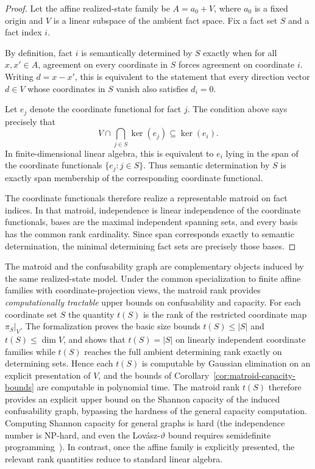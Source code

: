 \begin{proof}
Let the affine realized-state family be $A=a_0+V$, where $a_0$ is a fixed origin and $V$ is a linear subspace of the ambient fact space. Fix a fact set $S$ and a fact index $i$.

By definition, fact $i$ is semantically determined by $S$ exactly when for all $x,x'\in A$, agreement on every coordinate in $S$ forces agreement on coordinate $i$. Writing $d=x-x'$, this is equivalent to the statement that every direction vector $d\in V$ whose coordinates in $S$ vanish also satisfies $d_i=0$.

Let $e_j$ denote the coordinate functional for fact $j$. The condition above says precisely that
\[
V\cap \bigcap_{j\in S}\ker(e_j)\subseteq \ker(e_i).
\]
In finite-dimensional linear algebra, this is equivalent to $e_i$ lying in the span of the coordinate functionals $\{e_j:j\in S\}$. Thus semantic determination by $S$ is exactly span membership of the corresponding coordinate functional.

The coordinate functionals therefore realize a representable matroid on fact indices. In that matroid, independence is linear independence of the coordinate functionals, bases are the maximal independent spanning sets, and every basis has the common rank cardinality. Since span corresponds exactly to semantic determination, the minimal determining fact sets are precisely those bases.
\end{proof}

The matroid and the confusability graph are complementary objects induced by the same realized-state model. Under the common specialization to finite affine families with coordinate-projection views, the matroid rank provides \emph{computationally tractable} upper bounds on confusability and capacity. For each coordinate set $S$ the quantity $t(S)$ is the rank of the restricted coordinate map $\pi_S|_V$. The formalization proves the basic size bounds $t(S)\le |S|$ and $t(S)\le \dim V$, and shows that $t(S)=|S|$ on linearly independent coordinate families while $t(S)$ reaches the full ambient determining rank exactly on determining sets. Hence each $t(S)$ is computable by Gaussian elimination on an explicit presentation of $V$, and the bounds of Corollary~\ref{cor:matroid-capacity-bounds} are computable in polynomial time. The matroid rank $t(S)$ therefore provides an explicit upper bound on the Shannon capacity of the induced confusability graph, bypassing the hardness of the general capacity computation. Computing Shannon capacity for general graphs is hard (the independence number is NP-hard, and even the Lovász-$\vartheta$ bound requires semidefinite programming~\cite{pekosz2011complexity,grotschel1981ellipsoid}). In contrast, once the affine family is explicitly presented, the relevant rank quantities reduce to standard linear algebra.

